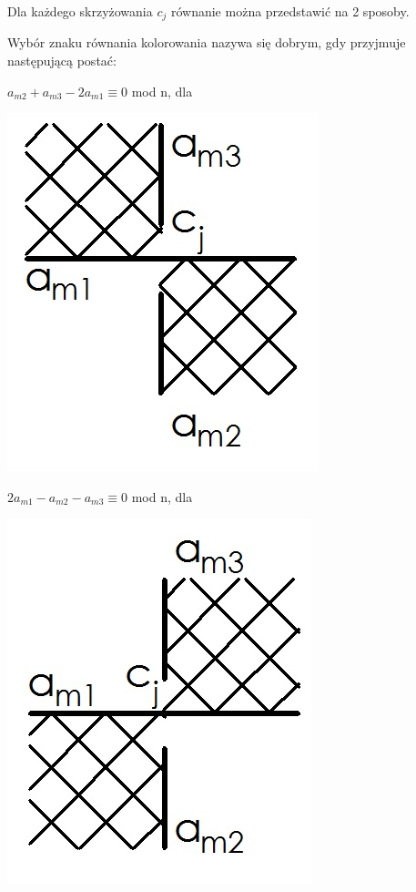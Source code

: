 Dla każdego skrzyżowania $c_{j}$ równanie można przedstawić na 2 sposoby. 

\begin{definicja}
Wybór znaku równania kolorowania nazywa się dobrym, gdy przyjmuje następującą postać: 
\end{definicja}

	\begin{minipage}{0.5\textwidth}
$a_{m2}+a_{m3}-2a_{m1} \equiv 0$ mod n, dla \\	
	\begin{center}
			\includegraphics[scale=0.3]{2/Obrazy/Cros+}
	\end{center}
	\end{minipage}
	\begin{minipage}{0.5\textwidth}
$2a_{m1}-a_{m2}-a_{m3} \equiv 0$ mod n, dla \\
	\begin{center}
			\includegraphics[scale=0.3]{2/Obrazy/Cros-}
	\end{center}	
	\end{minipage}

